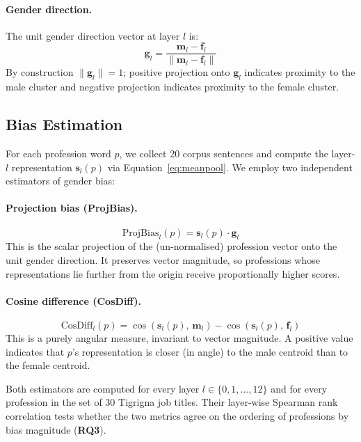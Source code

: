 \paragraph{Gender direction.}
The unit gender direction vector at layer $l$ is:
\begin{equation}
  \mathbf{g}_l = \frac{\mathbf{m}_l - \mathbf{f}_l}
                      {\|\mathbf{m}_l - \mathbf{f}_l\|}
\end{equation}
By construction $\|\mathbf{g}_l\| = 1$; positive projection onto $\mathbf{g}_l$
indicates proximity to the male cluster and negative projection indicates
proximity to the female cluster.

\subsection{Bias Estimation}

For each profession word $p$, we collect 20 corpus sentences and compute the
layer-$l$ representation $\mathbf{s}_l(p)$ via Equation~\ref{eq:meanpool}.
We employ two independent estimators of gender bias:

\paragraph{Projection bias (ProjBias).}
\begin{equation}
  \text{ProjBias}_l(p) = \mathbf{s}_l(p) \cdot \mathbf{g}_l
  \label{eq:proj}
\end{equation}
This is the scalar projection of the (un-normalised) profession vector onto the
unit gender direction. It preserves vector magnitude, so professions whose
representations lie further from the origin receive proportionally higher
scores.

\paragraph{Cosine difference (CosDiff).}
\begin{equation}
  \text{CosDiff}_l(p) = \cos\!\left(\mathbf{s}_l(p),\, \mathbf{m}_l\right)
                       - \cos\!\left(\mathbf{s}_l(p),\, \mathbf{f}_l\right)
  \label{eq:cosdiff}
\end{equation}
This is a purely angular measure, invariant to vector magnitude. A positive
value indicates that $p$'s representation is closer (in angle) to the male
centroid than to the female centroid.

Both estimators are computed for every layer $l \in \{0, 1, \ldots, 12\}$ and
for every profession in the set of 30 Tigrigna job titles. Their
layer-wise Spearman rank correlation tests whether the two metrics agree on the
ordering of professions by bias magnitude (\textbf{RQ3}).

